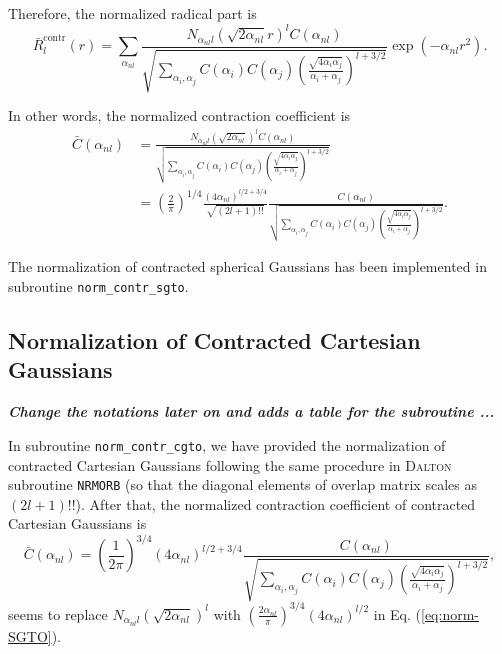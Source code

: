 \documentclass[a4paper,11pt,twoside,openright]{book}
\newcommand{\fixme}[1]{\textbf{\textit{\color{red} #1}}}
\begin{document}
Therefore, the normalized radical part is
\begin{equation}
  \bar{R}_{l}^\text{contr}(r)=\sum_{\alpha_{nl}}%
  \frac{N_{\alpha_{nl}l}(\sqrt{2\alpha_{nl}}r)^{l}C(\alpha_{nl})} %
    {\sqrt{\sum_{\alpha_{i},\alpha_{j}}C(\alpha_{i})C(\alpha_{j})%
  \left(\frac{\sqrt{4\alpha_{i}\alpha_{j}}}{\alpha_{i}+\alpha_{j}}\right)^{l+3/2}}}\exp(-\alpha_{nl}r^2).
\end{equation}

In other words, the normalized contraction coefficient is
\begin{align}
  \bar{C}(\alpha_{nl})
  \label{eq:norm-SGTO}
  &=\frac{N_{\alpha_{nl}l}(\sqrt{2\alpha_{nl}})^{l}C(\alpha_{nl})} %
    {\sqrt{\sum_{\alpha_{i},\alpha_{j}}C(\alpha_{i})C(\alpha_{j})%
    \left(\frac{\sqrt{4\alpha_{i}\alpha_{j}}}{\alpha_{i}+\alpha_{j}}\right)^{l+3/2}}}\\
  &=\left(\frac{2}{\pi}\right)^{1/4}\frac{(4\alpha_{nl})^{l/2+3/4}}{\sqrt{(2l+1)!!}} %
    \frac{C(\alpha_{nl})}{\sqrt{\sum_{\alpha_{i},\alpha_{j}}C(\alpha_{i})C(\alpha_{j})%
    \left(\frac{\sqrt{4\alpha_{i}\alpha_{j}}}{\alpha_{i}+\alpha_{j}}\right)^{l+3/2}}}.
\end{align}

The normalization of contracted spherical Gaussians has been implemented in subroutine\linebreak
\verb|norm_contr_sgto|.

\subsection{Normalization of Contracted Cartesian Gaussians}
\label{subsec:norm-cgto}

\fixme{Change the notations later on and adds a table for the subroutine ...}

In subroutine \verb|norm_contr_cgto|, we have provided
the normalization of contracted Cartesian Gaussians following the same procedure in \textsc{Dalton}
subroutine \verb|NRMORB| (so that the diagonal elements of overlap matrix scales as $(2l+1)!!$).
After that, the normalized contraction coefficient of contracted Cartesian Gaussians is
\begin{equation}
  \bar{C}(\alpha_{nl})=\left(\frac{1}{2\pi}\right)^{3/4}(4\alpha_{nl})^{l/2+3/4}%
    \frac{C(\alpha_{nl})}{\sqrt{\sum_{\alpha_{i},\alpha_{j}}C(\alpha_{i})C(\alpha_{j})%
    \left(\frac{\sqrt{4\alpha_{i}\alpha_{j}}}{\alpha_{i}+\alpha_{j}}\right)^{l+3/2}}},
\end{equation}
seems to replace $N_{\alpha_{nl}l}(\sqrt{2\alpha_{nl}})^{l}$ with
$(\frac{2\alpha_{nl}}{\pi})^{3/4}(4\alpha_{nl})^{l/2}$ in Eq. (\ref{eq:norm-SGTO}).
\end{document}
